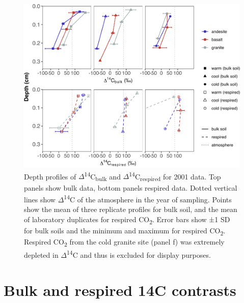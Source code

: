 \documentclass[english,man,floatsintext]{apa6}
\begin{document}
\begin{figure}

{\centering \includegraphics{sra-blk-inc-SI_files/figure-latex/plot-d14c-pro-01-1} 

}

\caption{Depth profiles of \(\Delta\)\textsuperscript{14}C\textsubscript{bulk} and \(\Delta\)\textsuperscript{14}C\textsubscript{respired} for 2001 data. Top panels show bulk data, bottom panels respired data. Dotted vertical lines show \(\Delta\)\textsuperscript{14}C of the atmosphere in the year of sampling. Points show the mean of three replicate profiles for bulk soil, and the mean of laboratory duplicates for respired CO\textsubscript{2}. Error bars show ±1 SD for bulk soils and the minimum and maximum for respired CO\textsubscript{2}. Respired CO\textsubscript{2} from the cold granite site (panel f) was extremely depleted in \(\Delta\)\textsuperscript{14}C and thus is excluded for display purposes.}\label{fig:plot-d14c-pro-01}
\end{figure}

\hypertarget{bulk-and-respired-14c-contrasts}{%
\section{Bulk and respired 14C contrasts}\label{bulk-and-respired-14c-contrasts}}





\begingroup\fontsize{10}{12}\selectfont
\end{document}

